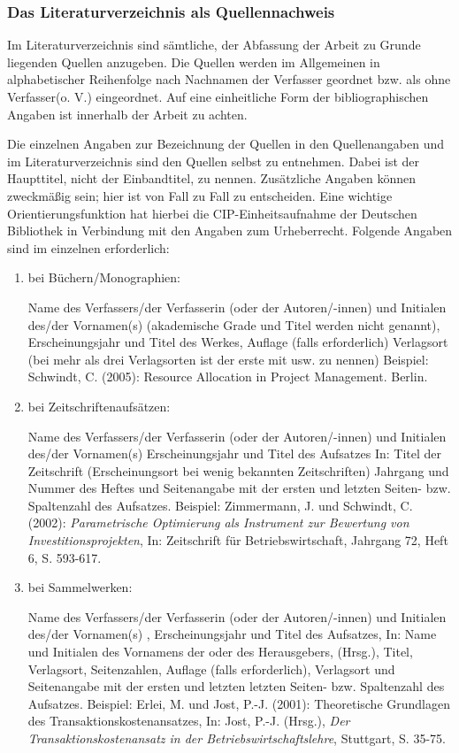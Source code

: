 \documentclass[a4paper, 12pt]{article}
\begin{document}
\subsubsection{Das Literaturverzeichnis als Quellennachweis}

Im Literaturverzeichnis sind s\"{a}mtliche, der Abfassung der Arbeit zu Grunde liegenden
Quellen anzugeben. Die Quellen werden im Allgemeinen in alphabetischer Reihenfolge
nach Nachnamen der Verfasser geordnet bzw. als \glqq ohne Verfasser\grqq (o. V.)
eingeordnet. Auf eine einheitliche Form der bibliographischen Angaben ist innerhalb
der Arbeit zu achten.

Die einzelnen Angaben zur Bezeichnung der Quellen in den Quellenangaben und im
Literaturverzeichnis sind den Quellen selbst zu entnehmen. Dabei ist der Haupttitel,
nicht der Einbandtitel, zu nennen. Zus\"{a}tzliche Angaben k\"{o}nnen zweckm\"{a}\ss ig sein; hier
ist von Fall zu Fall zu entscheiden. Eine wichtige Orientierungsfunktion hat hierbei
die CIP-Einheitsaufnahme der Deutschen Bibliothek in Verbindung mit den Angaben zum
Urheberrecht. Folgende Angaben sind im einzelnen erforderlich:

\begin{enumerate}

\item bei B\"{u}chern/Monographien:

Name des Verfassers/der Verfasserin (oder der Autoren/-innen) und Initialen des/der
Vornamen(s) (akademische Grade und Titel werden nicht genannt), Erscheinungsjahr und
Titel des Werkes, Auflage (falls erforderlich) Verlagsort (bei mehr als drei
Verlagsorten ist der erste mit usw. zu nennen) Beispiel: Schwindt, C. (2005):
Resource Allocation in Project Management. Berlin.

\item bei Zeitschriftenaufs\"{a}tzen:

Name des Verfassers/der Verfasserin (oder der Autoren/-innen) und Initialen des/der
Vornamen(s) Erscheinungsjahr und Titel des Aufsatzes In: Titel der Zeitschrift
(Erscheinungsort bei wenig bekannten Zeitschriften) Jahrgang und Nummer des Heftes
und Seitenangabe mit der ersten und letzten Seiten- bzw. Spaltenzahl des Aufsatzes.
Beispiel: Zimmermann, J. und Schwindt, C. (2002): \emph{Parametrische Optimierung
als Instrument zur Bewertung von Investitionsprojekten}, In: Zeitschrift f\"{u}r
Betriebswirtschaft, Jahrgang 72, Heft 6, S. 593-617.

\item bei Sammelwerken:

Name des Verfassers/der Verfasserin (oder der Autoren/-innen) und Initialen des/der
Vornamen(s) , Erscheinungsjahr und Titel des Aufsatzes, In: Name und Initialen des
Vornamens der oder des Herausgebers, (Hrsg.), Titel, Verlagsort, Seitenzahlen,
Auflage (falls erforderlich), Verlagsort und Seitenangabe mit der ersten und letzten
letzten Seiten- bzw. Spaltenzahl des Aufsatzes. Beispiel: Erlei, M. und Jost, P.-J.
(2001): Theoretische Grundlagen des Transaktionskostenansatzes, In: Jost, P.-J.
(Hrsg.), \emph{Der Transaktionskostenansatz in der Betriebswirtschaftslehre},
Stuttgart, S. 35-75.

\end{enumerate}
\end{document}

